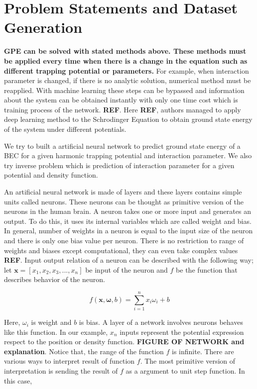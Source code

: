 \documentclass[a4paper,times,12pt]{article}
\begin{document}
\section{Problem Statements and Dataset Generation}

\textbf{GPE can be solved with stated methods above. These methods must be applied every time when there is a change in the equation such as different trapping potential or parameters.} For example, when interaction parameter is changed, if there is no analytic solution, numerical method must be reapplied. With machine learning these steps can be bypassed and information about the system can be obtained instantly with only one time cost which is training process of the network. \textbf{REF}. Here \textbf{REF}, authors managed to apply deep learning method to the Schrodinger Equation to obtain ground state energy of the system under different potentials. 

We try to built a artificial neural network to predict ground state energy of a BEC for a given harmonic trapping potential and interaction parameter. We also try inverse problem which is prediction of interaction parameter for a given potential and density function. 

An artificial neural network is made of layers and these layers contains simple units called neurons. These neurons can be thought as primitive version of the neurons in the human brain. A neuron takes one or more input and generates an output. To do this, it uses its internal variables which are called weight and bias. In general, number of weights in a neuron is equal to the input size of the neuron and there is only one bias value per neuron. There is no restriction to range of weights and biases except computational, they can even take complex values {\textbf{REF}}. Input output relation of a neuron can be described with the following way; let $\boldsymbol{x} = [x_1, x_2, x_3, ..., x_n]$ be input of the neuron and $f$ be the function that describes behavior of the neuron. 

\begin{equation}
\label{eq:NU_neuron}
f(\boldsymbol{x}, \boldsymbol{\omega}, b) = \sum\limits_{i = 1}^n x_i\omega_i + b
\end{equation}

Here, $\omega_i$ is weight and $b$ is bias. A layer of a network involves neurons behaves like this function. In our example, $x_n$ inputs represent the potential expression respect to the position or density function. \textbf{FIGURE OF NETWORK and explanation}. Notice that, the range of the function $f$ is infinite. There are various ways to interpret result of function $f$. The most primitive version of interpretation is sending the result of $f$ as a argument to unit step function. In this case, 
\end{document}
